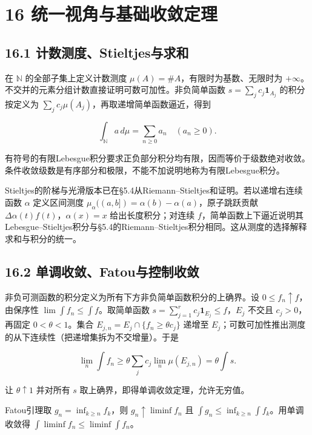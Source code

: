 \documentclass[11pt,a4paper]{article}
\begin{document}
\section{16
统一视角与基础收敛定理}\label{ux7edfux4e00ux89c6ux89d2ux4e0eux57faux7840ux6536ux655bux5b9aux7406}

\subsection{16.1
计数测度、Stieltjes与求和}\label{ux8ba1ux6570ux6d4bux5ea6stieltjesux4e0eux6c42ux548c}

在 \(\mathbb N\) 的全部子集上定义计数测度
\(\mu(A)=\#A\)，有限时为基数、无限时为
\(+\infty\)。不交并的元素分组计数直接证明可数可加性。非负简单函数
\(s=\sum_jc_j\mathbf1_{A_j}\) 的积分按定义为
\(\sum_jc_j\mu(A_j)\)，再取递增简单函数逼近，得到

\[
\int_{\mathbb N}a\,d\mu=\sum_{n\ge0}a_n\quad(a_n\ge0).
\]

有符号的有限Lebesgue积分要求正负部分积分均有限，因而等价于级数绝对收敛。条件收敛级数是有序部分和极限，不能不加说明地称为有限Lebesgue积分。

Stieltjes的阶梯与光滑版本已在§5.4从Riemann--Stieltjes和证明。若以递增右连续函数
\(\alpha\) 定义区间测度
\(\mu_\alpha((a,b])=\alpha(b)-\alpha(a)\)，原子跳跃贡献
\(\Delta\alpha(t)f(t)\)，\(\alpha(x)=x\) 给出长度积分；对连续
\(f\)，简单函数上下逼近说明其Lebesgue--Stieltjes积分与§5.4的Riemann--Stieltjes积分相同。这从测度的选择解释求和与积分的统一。

\subsection{16.2
单调收敛、Fatou与控制收敛}\label{ux5355ux8c03ux6536ux655bfatouux4e0eux63a7ux5236ux6536ux655b}

非负可测函数的积分定义为所有下方非负简单函数积分的上确界。设
\(0\le f_n\uparrow f\)，由保序性 \(\lim\int f_n\le\int f\)。取简单函数
\(s=\sum_{j=1}^rc_j\mathbf1_{E_j}\le f\)，\(E_j\) 不交且
\(c_j>0\)，再固定 \(0<\theta<1\)。集合
\(E_{j,n}=E_j\cap\{f_n\ge\theta c_j\}\) 递增至
\(E_j\)；可数可加性推出测度的从下连续性（把递增集拆为不交增量）。于是

\[
\lim_n\int f_n\ge\theta\sum_jc_j\lim_n\mu(E_{j,n})
=\theta\int s.
\]

让 \(\theta\uparrow1\) 并对所有 \(s\)
取上确界，即得单调收敛定理，允许无穷值。

Fatou引理取 \(g_n=\inf_{k\ge n}f_k\)，则 \(g_n\uparrow\liminf f_n\) 且
\(\int g_n\le\inf_{k\ge n}\int f_k\)。用单调收敛得
\(\int\liminf f_n\le\liminf\int f_n\)。
\end{document}
